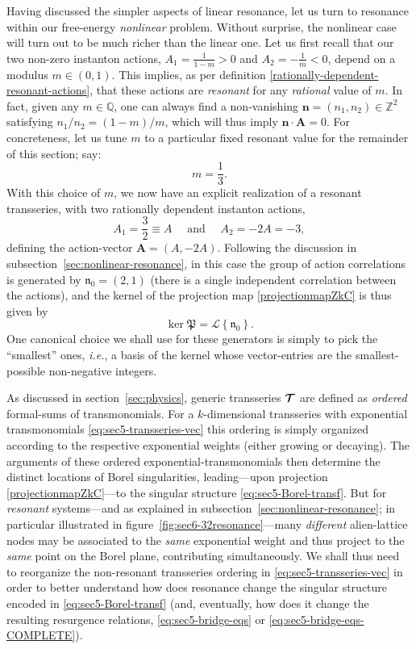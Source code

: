 \documentclass[11pt,a4paper]{article}
\newcommand{\CT}{{\cal T}}
\def\BZ{{\mathbb Z}}
\def\BQ{{\mathbb Q}}
\newcommand{\be}{\begin{equation}}
\newcommand{\ee}{\end{equation}}
\newcommand{\nres}{\boldsymbol{\mathfrak{n}}_0}
\begin{document}
Having discussed the simpler aspects of linear resonance, let us turn to resonance within our free-energy \textit{nonlinear} problem. Without surprise, the nonlinear case will turn out to be much richer than the linear one. Let us first recall that our two non-zero instanton actions, $A_1 = \frac{1}{1-m} > 0$ and $A_2 = - \frac{1}{m} < 0$, depend on a modulus $m \in (0,1)$. This implies, as per definition \eqref{rationally-dependent-resonant-actions}, that these actions are \textit{resonant} for any \textit{rational} value of $m$. In fact, given any $m \in \BQ$, one can always find a non-vanishing $\boldsymbol{n} = (n_1,n_2) \in \BZ^2$ satisfying $n_1/n_2=(1-m)/m$, which will thus imply $\boldsymbol{n} \cdot \boldsymbol{A} = 0$. For concreteness, let us tune $m$ to a particular fixed resonant value for the remainder of this section; say:
%
\begin{equation}
m = \frac{1}{3}.
\end{equation}
%
\noindent
With this choice of $m$, we now have an explicit realization of a resonant transseries, with two rationally dependent instanton actions,
%
\begin{equation}
A_1 = \frac{3}{2} \equiv A \quad \text{ and } \quad A_2 = -2A = -3,
\end{equation}
%
\noindent
defining the action-vector $\boldsymbol{A} = (A,-2A)$. Following the discussion in subsection~\ref{sec:nonlinear-resonance}, in this case the group of action correlations is generated by $\nres = (2,1)$ (there is a single independent correlation between the actions), and the kernel of the projection map  \eqref{projectionmapZkC} is thus given by
%
\be
\label{ell-res-vector}
\ker \mathfrak{P} = \mathcal{L} \left\{ \nres \right\}.
\ee
%
\noindent
One canonical choice we shall use for these generators is simply to pick the ``smallest'' ones, \textit{i.e.}, a basis of the kernel whose vector-entries are the smallest-possible non-negative integers.

As discussed in section~\ref{sec:physics}, generic transseries $\boldsymbol{\CT}$ are defined as \textit{ordered} formal-sums of transmonomials. For a $k$-dimensional transseries with exponential transmonomials \eqref{eq:sec5-transseries-vec} this ordering is simply organized according to the respective exponential weights (either growing or decaying). The arguments of these ordered exponential-transmonomials then determine the distinct locations of Borel singularities, leading---upon projection \eqref{projectionmapZkC}---to the singular structure \eqref{eq:sec5-Borel-transf}. But for \textit{resonant} systems---and as explained in subsection~\ref{sec:nonlinear-resonance}; in particular illustrated in figure~\ref{fig:sec6-32resonance}---many \textit{different} alien-lattice nodes may be associated to the \textit{same} exponential weight and thus project to the \textit{same} point on the Borel plane, contributing simultaneously. We shall thus need to reorganize the non-resonant transseries ordering in \eqref{eq:sec5-transseries-vec} in order to better understand how does resonance change the singular structure encoded in \eqref{eq:sec5-Borel-transf} (and, eventually, how does it change the resulting resurgence relations, \eqref{eq:sec5-bridge-eqs} or \eqref{eq:sec5-bridge-eqs-COMPLETE}).
\end{document}
